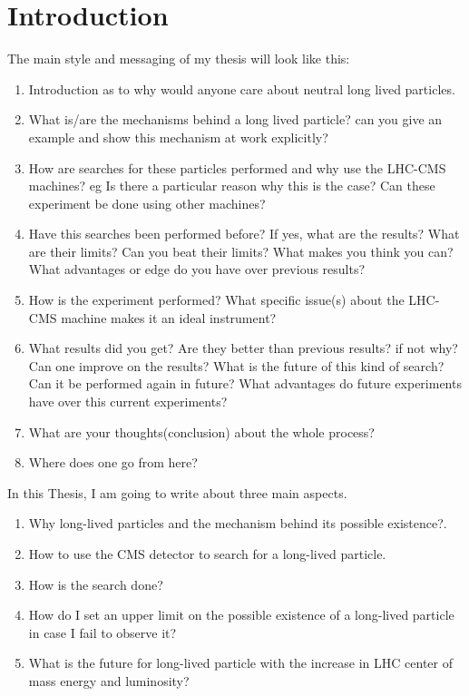 \chapter{Introduction}
\label{intro_chapter}
The main style and messaging of my thesis will look like this:
\begin{enumerate}
\item Introduction as to why would anyone care about neutral long lived particles.
\item What is/are the mechanisms behind a long lived particle? can you give an example and show this mechanism at work explicitly?
\item How are searches for these particles performed and why use the LHC-CMS machines? eg Is there a particular reason why this is the case? Can these experiment be done using other machines?
\item Have this searches been performed before? If yes, what are the results? What are their limits?  Can you beat their limits? What makes you think you can? What advantages or edge do you have over previous results?
\item  How is the experiment performed? What specific issue(s) about the LHC-CMS machine makes it an ideal instrument?
\item  What results did you get? Are they better than previous results? if not why? Can one improve on the results? What is the future of this kind of
search? Can it be performed again  in future? What  advantages do future experiments have over this current experiments?
\item  What are your thoughts(conclusion) about the whole process?
\item  Where does one go from here?
\end{enumerate}

In this Thesis, I am going to write about three main aspects.
\begin{enumerate}
\item  Why long-lived particles  and the mechanism behind its possible existence?.
\item  How to use the CMS detector to search for a long-lived particle.
\item How is the search done?
\item  How do I set an upper limit on the possible existence of a long-lived particle in case I fail to observe it?
\item  What is the future for long-lived particle with the increase in LHC center of mass energy and luminosity?
\end{enumerate}

